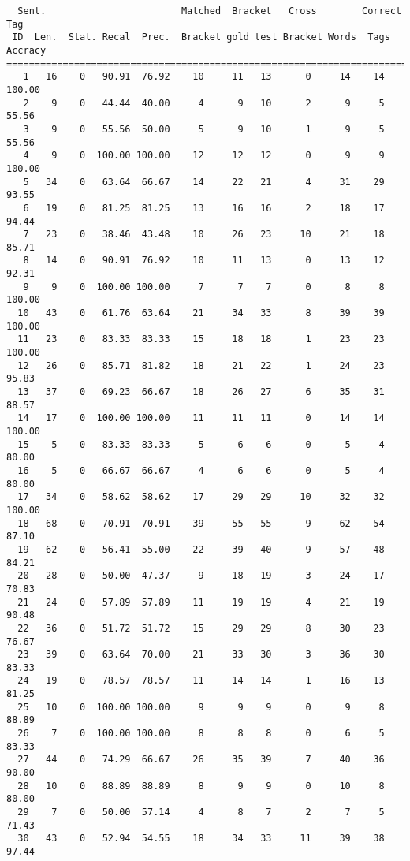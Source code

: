\scriptsize
\begin{verbatim}
  Sent.                        Matched  Bracket   Cross        Correct Tag
 ID  Len.  Stat. Recal  Prec.  Bracket gold test Bracket Words  Tags Accracy
============================================================================
   1   16    0   90.91  76.92    10     11   13      0     14    14   100.00
   2    9    0   44.44  40.00     4      9   10      2      9     5    55.56
   3    9    0   55.56  50.00     5      9   10      1      9     5    55.56
   4    9    0  100.00 100.00    12     12   12      0      9     9   100.00
   5   34    0   63.64  66.67    14     22   21      4     31    29    93.55
   6   19    0   81.25  81.25    13     16   16      2     18    17    94.44
   7   23    0   38.46  43.48    10     26   23     10     21    18    85.71
   8   14    0   90.91  76.92    10     11   13      0     13    12    92.31
   9    9    0  100.00 100.00     7      7    7      0      8     8   100.00
  10   43    0   61.76  63.64    21     34   33      8     39    39   100.00
  11   23    0   83.33  83.33    15     18   18      1     23    23   100.00
  12   26    0   85.71  81.82    18     21   22      1     24    23    95.83
  13   37    0   69.23  66.67    18     26   27      6     35    31    88.57
  14   17    0  100.00 100.00    11     11   11      0     14    14   100.00
  15    5    0   83.33  83.33     5      6    6      0      5     4    80.00
  16    5    0   66.67  66.67     4      6    6      0      5     4    80.00
  17   34    0   58.62  58.62    17     29   29     10     32    32   100.00
  18   68    0   70.91  70.91    39     55   55      9     62    54    87.10
  19   62    0   56.41  55.00    22     39   40      9     57    48    84.21
  20   28    0   50.00  47.37     9     18   19      3     24    17    70.83
  21   24    0   57.89  57.89    11     19   19      4     21    19    90.48
  22   36    0   51.72  51.72    15     29   29      8     30    23    76.67
  23   39    0   63.64  70.00    21     33   30      3     36    30    83.33
  24   19    0   78.57  78.57    11     14   14      1     16    13    81.25
  25   10    0  100.00 100.00     9      9    9      0      9     8    88.89
  26    7    0  100.00 100.00     8      8    8      0      6     5    83.33
  27   44    0   74.29  66.67    26     35   39      7     40    36    90.00
  28   10    0   88.89  88.89     8      9    9      0     10     8    80.00
  29    7    0   50.00  57.14     4      8    7      2      7     5    71.43
  30   43    0   52.94  54.55    18     34   33     11     39    38    97.44

\end{verbatim}
